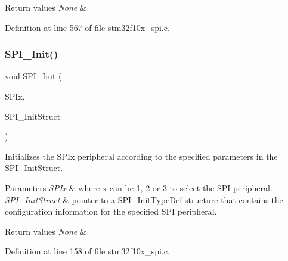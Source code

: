 \begin{DoxyRetVals}{Return values}
{\em None} & \\
\hline
\end{DoxyRetVals}


Definition at line 567 of file stm32f10x\+\_\+spi.\+c.

\mbox{\label{group___s_p_i___private___functions_ga8dacc1dc48bf08c0f12da409f4889037}} 
\subsubsection{\texorpdfstring{S\+P\+I\+\_\+\+Init()}{SPI\_Init()}}
{\footnotesize\ttfamily void S\+P\+I\+\_\+\+Init (\begin{DoxyParamCaption}\item[{\hyperlink{struct_s_p_i___type_def}{S\+P\+I\+\_\+\+Type\+Def} $\ast$}]{S\+P\+Ix,  }\item[{\hyperlink{struct_s_p_i___init_type_def}{S\+P\+I\+\_\+\+Init\+Type\+Def} $\ast$}]{S\+P\+I\+\_\+\+Init\+Struct }\end{DoxyParamCaption})}



Initializes the S\+P\+Ix peripheral according to the specified parameters in the S\+P\+I\+\_\+\+Init\+Struct. 


\begin{DoxyParams}{Parameters}
{\em S\+P\+Ix} & where x can be 1, 2 or 3 to select the S\+PI peripheral. \\
\hline
{\em S\+P\+I\+\_\+\+Init\+Struct} & pointer to a \hyperlink{struct_s_p_i___init_type_def}{S\+P\+I\+\_\+\+Init\+Type\+Def} structure that contains the configuration information for the specified S\+PI peripheral. \\
\hline
\end{DoxyParams}

\begin{DoxyRetVals}{Return values}
{\em None} & \\
\hline
\end{DoxyRetVals}


Definition at line 158 of file stm32f10x\+\_\+spi.\+c.

\mbox{\label{group___s_p_i___private___functions_ga56fc508a482f032f9eb80e4c63184126}} 
